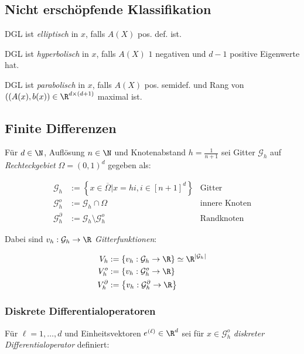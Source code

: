 \subsection*{Nicht erschöpfende Klassifikation}

DGL ist \emph{elliptisch} in $x$, falls $A(X)$ pos. def. ist.

\spacing

DGL ist \emph{hyperbolisch} in $x$, falls $A(X)$ $1$ negativen und $d-1$ positive Eigenwerte hat.

\spacing

DGL ist \emph{parabolisch} in $x$, falls $A(X)$ pos. semidef. und Rang von $((A(x),b(x)) \in \R^{d \times (d+1)}$ maximal ist.


\subsection*{Finite Differenzen}

Für $d \in \N$, Auflösung $n \in \N$ und Knotenabstand $h = \frac{1}{n+1}$ sei  Gitter $\mathcal{G}_h$ auf \emph{Rechteckgebiet} $\Omega = (0,1)^d$ gegeben als:

\vspace*{-4mm}
\begin{align*}
	\mathcal{G}_h &:= \left\{ x \in \overline\Omega | x = hi, i \in [n+1]^d\right\} &\text{Gitter} \\
\mathcal{G}_h^o &:= \mathcal{G}_h \cap \Omega &\text{innere Knoten} \\
\mathcal{G}_h^\partial &:= \mathcal{G}_h \setminus \mathcal{G}_h^o &\text{Randknoten}
\end{align*}

Dabei sind $v_h : \mathcal{G}_h \to \R$ \emph{Gitterfunktionen}:

\vspace*{-4mm}
\begin{align*}
V_h &:= \left\{ v_h : \mathcal{G}_h \to \R \right\} \simeq \R^{|\mathcal{G}_h|} \\
V_h^o &:= \left\{ v_h : \mathcal{G}_h^o \to \R \right\} \\
V_h^\partial &:= \left\{ v_h : \mathcal{G}_h^\partial \to \R \right\}
\end{align*}

\subsubsection*{Diskrete Differentialoperatoren}

Für $\ell = 1,\dots,d$ und Einheitsvektoren $e^{(\ell)} \in \R^d$ sei für $x \in \mathcal{G}_h^o$ \emph{diskreter Differentialoperator} definiert:

